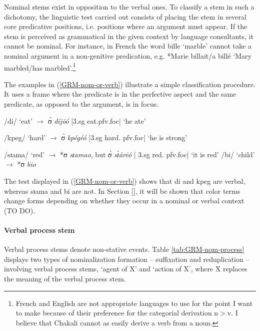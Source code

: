 \begin{exe}
\begin{exe}
\begin{exe}
{\begin{exe}
\begin{exe}
\begin{exe}
\begin{exe}
Nominal stems exist in opposition to the verbal ones. To classify a stem in such
a dichotomy, the linguistic test carried out consists of placing the stem in
several core predicative positions, i.e. positions where an
argument must appear. If the stem is perceived as grammatical in the given
context by 
language consultants, it cannot be nominal. For instance, in French the word
{\sls bille}  `marble' cannot take a nominal argument in a non-genitive
predication, e.g. *Marie billait/a billé  `Mary marbled/has
marbled'.\footnote{\label{ft:GRM-fre-eng-deri}French and English are not 
appropriate languages to use
for the point I want to make  because of their preference  for the categorial
derivation n$>$v. I believe that
Chakali cannot as easily derive a verb from a noun.}



The examples in
(\ref{GRM-nom-or-verb}) illustrate a simple classification procedure. It uses a
frame where the predicate is in the 
perfective aspect and  the same 
predicate, as opposed to the argument,  is in focus.

\ea\label{GRM-nom-or-verb}
 
\ea /di/   {\rm`eat'}  $\rightarrow$ {\it ʊ̀  díjōó}  {\rm |{\sc 3.sg} 
eat.{\sc pfv.foc}| 
`he
ate'}

  \ex /kpeg/  {\rm `hard'}  $\rightarrow$ {\it ʊ̀ kpégéó} {\rm  |{\sc 3.sg} 
hard.{\sc
pfv.foc}| `he is strong'}

   \ex /sɪama/  {\rm`red'}  $\rightarrow$ *{\it ʊ sɪamao}, {\rm but}  {\it ʊ̀ 
sɪ́árēó} 
 {\rm |{\sc
3.sg} red.{\sc
pfv.foc}|  `it is
red'} 
   \ex /bi/  {\rm `child'} $\rightarrow$  *{\it ʊ bio} 
 

\z 
 \z


The test displayed in (\ref{GRM-nom-or-verb}) shows that  {\sls di} and  {\sls 
kpeg} are verbal,  whereas {\sls sɪama} and {\sls bi} are not. In
Section \ref{}, it will be shown that color terms change forms
depending on whether
they occur  in a nominal or verbal context (TO DO).  


\paragraph{Verbal process stem}
\label{sec:GRM-verb-act-stem}


Verbal process stems denote non-stative events. Table \ref{tab:GRM-nom-process} 
displays  two types of nominalization formation -- suffixation and 
reduplication -- involving verbal process stems,  `agent of X' and `action of 
X', where X replaces the meaning of the verbal process stem. 


\end{exe}
\end{exe}
\end{exe}
\end{exe}}
\end{exe}
\end{exe}
\end{exe}
